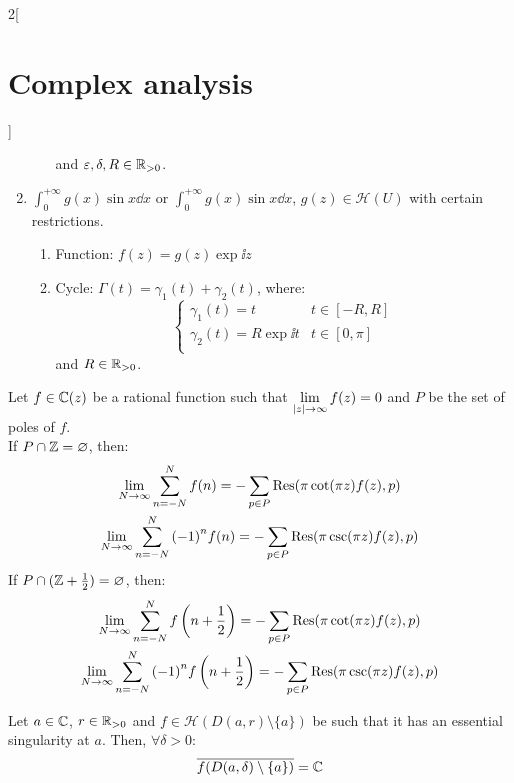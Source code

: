 \documentclass[../../../main.tex]{subfiles}
\begin{document}
\begin{multicols}{2}[\section{Complex analysis}]
\begin{method}
\begin{enumerate}
\begin{enumerate}
$$                    $$
                    and $\varepsilon,\delta,R\in\mathbb{R}_{>0}$.
            \end{enumerate}
      \item $\displaystyle\int_0^{+\infty} g(x)\sin{x}\dd{x}$ or $\displaystyle\int_0^{+\infty} g(x)\sin{x}\dd{x}$, $g(z)\in\mathcal{H}(U)$ with certain restrictions.
            \begin{enumerate}
              \item Function: $f(z)=g(z)\exp{\ii z}$
              \item Cycle:  $\Gamma(t)=\gamma_1(t)+\gamma_2(t)$, where:
                    $$
                      \begin{cases}
                        \gamma_1(t)=t            & t\in[-R,R]  \\
                        \gamma_2(t)=R\exp{\ii t} & t\in[0,\pi] \\
                      \end{cases}
                    $$
                    and $R\in\mathbb{R}_{>0}$.
            \end{enumerate}
    \end{enumerate}
  \end{method}
  \begin{theorem}
    Let $f\in\mathbb{C}(z)$ be a rational function such that $\displaystyle\lim_{\abs{z}\to\infty}f(z)=0$ and $P$ be the set of poles of $f$. \\
    If $P\cap\mathbb{Z}=\varnothing$, then:
    \begin{gather*}
      \lim_{N\to\infty}\sum_{n=-N}^Nf(n)         =-\sum_{p\in P}\Res(\pi\cot(\pi z)f(z),p) \\
      \lim_{N\to\infty}\sum_{n=-N}^N{(-1)}^nf(n) =-\sum_{p\in P}\Res(\pi\csc(\pi z)f(z),p)
    \end{gather*}
    If $P\cap(\mathbb{Z}+\frac{1}{2})=\varnothing$, then:
    \begin{gather*}
      \lim_{N\to\infty}\sum_{n=-N}^Nf\left(n+\frac{1}{2}\right)         =-\sum_{p\in P}\Res(\pi\cot(\pi z)f(z),p) \\
      \lim_{N\to\infty}\sum_{n=-N}^N{(-1)}^nf\left(n+\frac{1}{2}\right) =-\sum_{p\in P}\Res(\pi\csc(\pi z)f(z),p)
    \end{gather*}
  \end{theorem}
  \begin{theorem}
    Let $a\in\mathbb{C}$, $r\in\mathbb{R}_{>0}$ and $f\in\mathcal{H}(D(a,r)\setminus\{a\})$ be such that it has an essential singularity at $a$. Then, $\forall \delta>0$: $$\overline{f(D(a,\delta)\setminus\{a\})}=\mathbb{C}$$

\end{theorem}
\end{multicols}
\end{document}
